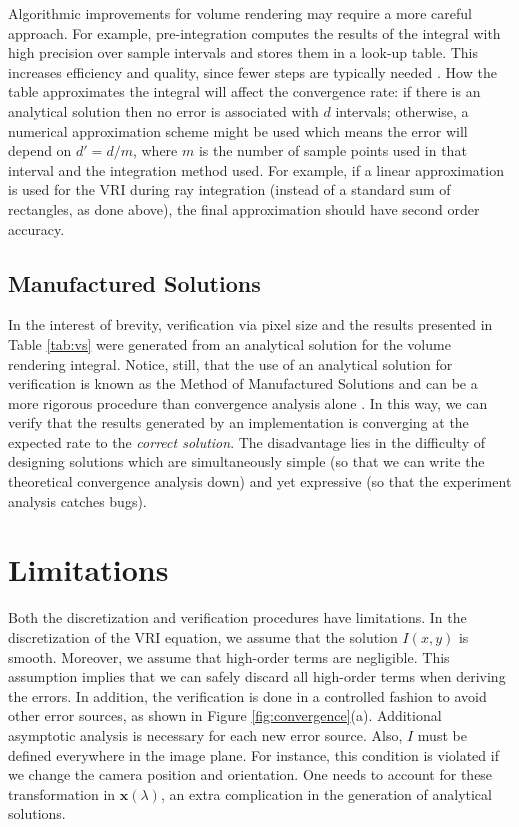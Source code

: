 Algorithmic improvements for volume rendering may require a more
careful approach. For example, pre-integration computes the results of
the integral with high precision over sample intervals and stores them
in a look-up table. This increases efficiency and quality, since
fewer steps are typically needed \cite{Engel01}. How the table
approximates the integral will affect the convergence rate: if there
is an analytical solution then no error is associated with $d$
intervals; otherwise, a numerical approximation scheme might be used
which means the error will depend on $d' = d / m$, where $m$ is the
number of sample points used in that interval and the integration
method used. For example, if a linear approximation is used for the
VRI during ray integration (instead of a standard sum of rectangles,
as done above), the final approximation should have second order
accuracy.

\subsection{Manufactured Solutions}

%
In the interest of brevity, verification via pixel size and the
results presented in Table \ref{tab:vs} were generated from an
analytical solution for the volume rendering integral. Notice, still,
that the use of an analytical solution for verification is known as
the Method of Manufactured Solutions \cite{babuska04} and can be a
more rigorous procedure than convergence analysis alone
\cite{Roy2005}. 
In this way, we can verify that the results generated
by an implementation is converging at the expected rate to the
\emph{correct solution}. 
The disadvantage lies in the difficulty of
designing solutions which are simultaneously simple (so
that we can write the theoretical convergence analysis down) and
yet expressive (so that the experiment analysis catches bugs).

\section{Limitations}
\label{sec:limitations}
 
Both the discretization and verification procedures have
limitations. In the discretization of the VRI equation, we assume that
the solution $I(x,y)$ is smooth. Moreover, we assume that high-order
terms are negligible. This assumption implies that we can safely
discard all high-order terms when deriving the errors.  In addition,
the verification is done in a controlled fashion to avoid other error
sources, as shown in 
Figure \ref{fig:convergence}(a). Additional asymptotic analysis 
is necessary for each new error source. Also, $I$ must
be defined everywhere in the image plane. For instance, this condition
is violated if we change the camera position and orientation. One
needs to account for these transformation in $\mathbf{x}(\lambda)$, an
extra complication in the generation of analytical solutions.

